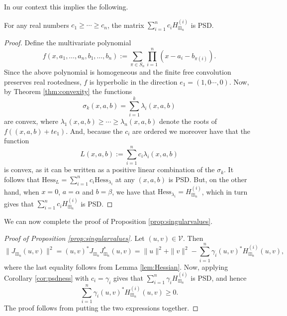 \documentclass[12pt]{amsart}
\newcommand{\calV}{\mathcal{V}}
\newcommand{\jac}{J_{\boxplus_n}}
\newcommand{\hessconv}{H_{\boxplus_n}^{(i)}}
\begin{document}
In our context this implies the following. 

\begin{corollary}
\label{cor:psdness}
   For any real numbers $c_1\geq \cdots \geq c_n $, the matrix 
   $\sum_{i=1}^n c_i \hessconv$ is PSD. 
\end{corollary}

\begin{proof}
    Define the multivariate polynomial 
    $$f(x, a_1,\dots, a_n, b_1, \dots,  b_n) := \sum_{\pi\in S_n} \prod_{i=1}^n (x-a_i-b_{\pi(i)}).$$
    Since the above polynomial is homogeneous and the finite free convolution preserves real rootedness, $f$ is hyperbolic in the direction $e_1=(1, 0\cdots, 0)$. Now, by Theorem \ref{thm:convexity} the functions
    $$\sigma_k(x, a, b) = \sum_{i=1}^k \lambda_i(x, a, b)$$
    are convex, where $\lambda_1(x, a, b)\geq \cdots \geq \lambda_n(x, a, b)$ denote the roots of $f((x, a, b)+t e_1)$. And, because the $c_i$ are ordered we moreover have that the function 
    $$L(x, a, b):=\sum_{i=1}^n c_i \lambda_i(x,a, b)$$
    is convex, as it can be written as a positive linear combination of the $\sigma_k$. It follows that $\mathrm{Hess}_{L} = \sum_{i=1}^n c_i \mathrm{Hess}_{\lambda_i}$ at any $(x, a, b)$ is PSD. But, on the other hand, when $x=0$, $a=\alpha$ and $b = \beta$, we have that $\mathrm{Hess}_{\lambda_i} = \hessconv$, which in turn gives that $\sum_{i=1}^n c_i \hessconv$ is PSD. 
\end{proof}


We can now complete the proof of Proposition \ref{prop:singularvalues}. 

\begin{proof}[Proof of Proposition \ref{prop:singularvalues}]
  Let $(u, v)\in \calV$. Then 
  $$\|\jac(u, v)\|^2 = (u, v)^* \jac \jac^* (u, v) = \|u\|^2+\|v\|^2-\sum_{i=1}^n \gamma_i (u, v)^* \hessconv (u, v),$$
where the last equality follows from Lemma \ref{lem:Hessian}. Now, applying Corollary \ref{cor:psdness} with $c_i=\gamma_i$ gives that $\sum_{i=1}^n \gamma_i \hessconv$ is PSD, and hence 
$$\sum_{i=1}^n \gamma_i (u, v)^* \hessconv (u, v)\geq 0.$$
The proof follows from putting the two expressions together. 
\end{proof}



\end{document}
